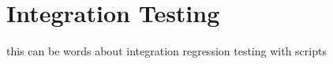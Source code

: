 %
%
\section{Integration Testing}
\label{sec:integration}

this can be words about integration regression testing with scripts

%
%

